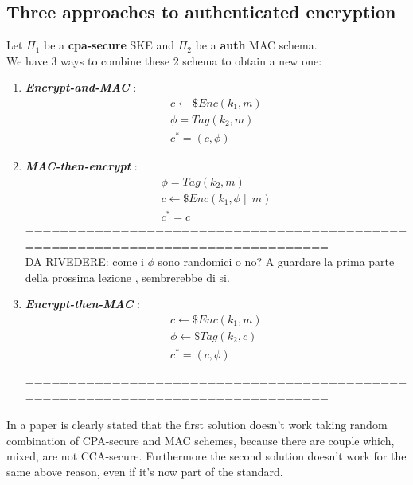 \subsection{Three approaches to authenticated encryption}
Let $\Pi_{1}$ be a \textbf{cpa-secure} SKE and $\Pi_{2}$ be a \textbf{auth} MAC
schema.\\
We have 3 ways to combine these 2 schema to obtain a new one:
\begin{enumerate}
    \item \textbf{ \textit{Encrypt-and-MAC} } :
        \begin{gather*}
            c \leftarrow\$ Enc(k_{1}, m)\\
            \phi = Tag(k_{2}, m)\\
            c^{*}=(c, \phi)
        \end{gather*}
        
    \item  \textbf{ \textit{MAC-then-encrypt} } :
        \begin{gather*}
            \phi = Tag(k_{2}, m)\\
            c \leftarrow\$ Enc(k_{1}, \phi \| m)\\
            c^{*}=c
        \end{gather*}
===============================================================================\\
DA RIVEDERE: come i $\phi$ sono randomici o no? A guardare la prima parte della
prossima lezione , sembrerebbe di si.\\
    \item  \textbf{ \textit{Encrypt-then-MAC} } :
        \begin{gather*}
            c \leftarrow\$ Enc(k_{1}, m)\\
            \phi \leftarrow\$ Tag(k_{2}, c) \\
            c^{*}=(c, \phi)
        \end{gather*}
        
===============================================================================\\
\end{enumerate}
In a paper is clearly stated that the first solution doesn't work taking random
combination of CPA-secure and MAC schemes, because there are couple which,
mixed, are not CCA-secure. Furthermore the second solution doesn't work for the
same above reason, even if it's now part of the standard.\\

